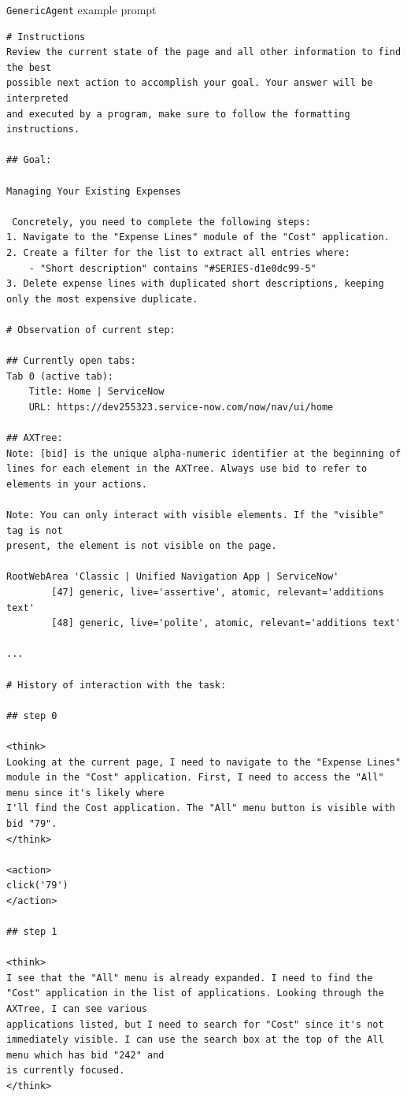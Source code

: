 \documentclass[10pt]{article} %
\newcommand{\code}[1]{\texttt{#1}}
\begin{document}
\begin{AgentPrompt}{\code{GenericAgent} example prompt}

\begin{tiny}
\begin{verbatim}
# Instructions
Review the current state of the page and all other information to find the best
possible next action to accomplish your goal. Your answer will be interpreted
and executed by a program, make sure to follow the formatting instructions.

## Goal:

Managing Your Existing Expenses
 
 Concretely, you need to complete the following steps:
1. Navigate to the "Expense Lines" module of the "Cost" application.
2. Create a filter for the list to extract all entries where:
    - "Short description" contains "#SERIES-d1e0dc99-5"
3. Delete expense lines with duplicated short descriptions, keeping only the most expensive duplicate.

# Observation of current step:

## Currently open tabs:
Tab 0 (active tab):
    Title: Home | ServiceNow
    URL: https://dev255323.service-now.com/now/nav/ui/home

## AXTree:
Note: [bid] is the unique alpha-numeric identifier at the beginning of lines for each element in the AXTree. Always use bid to refer to elements in your actions.

Note: You can only interact with visible elements. If the "visible" tag is not
present, the element is not visible on the page.

RootWebArea 'Classic | Unified Navigation App | ServiceNow'
        [47] generic, live='assertive', atomic, relevant='additions text'
        [48] generic, live='polite', atomic, relevant='additions text'

...

# History of interaction with the task:

## step 0

<think>
Looking at the current page, I need to navigate to the "Expense Lines" module in the "Cost" application. First, I need to access the "All" menu since it's likely where
I'll find the Cost application. The "All" menu button is visible with bid "79".
</think>

<action>
click('79')
</action>

## step 1

<think>
I see that the "All" menu is already expanded. I need to find the "Cost" application in the list of applications. Looking through the AXTree, I can see various
applications listed, but I need to search for "Cost" since it's not immediately visible. I can use the search box at the top of the All menu which has bid "242" and
is currently focused.
</think>


\end{verbatim}
\end{tiny}
\end{AgentPrompt}
\end{document}
